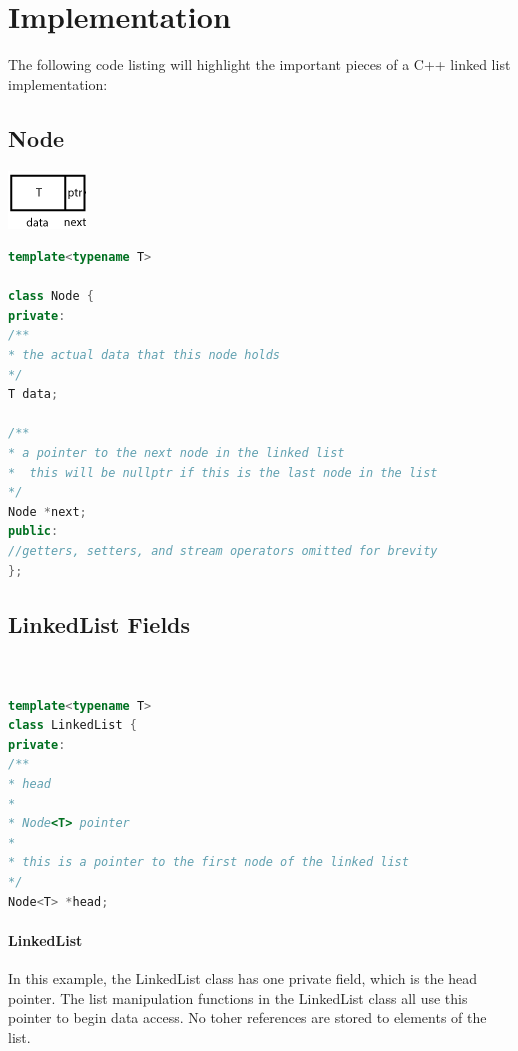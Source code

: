 \documentclass[12pt]{article}
\begin{document}
\newpage

\section{Implementation}

The following code listing will highlight the important pieces of a C++ linked list implementation:

\subsection{Node}

\includegraphics{node_diagram}

\begin{lstlisting}[language = C++]
template<typename T>

class Node {
private:
/**
* the actual data that this node holds
*/
T data;

/**
* a pointer to the next node in the linked list
*  this will be nullptr if this is the last node in the list
*/
Node *next;
public:
//getters, setters, and stream operators omitted for brevity
};
\end{lstlisting}

\newpage

\subsection{LinkedList Fields}

\begin{lstlisting}[language = C++]


template<typename T>
class LinkedList {
private:
/**
* head
*
* Node<T> pointer
*
* this is a pointer to the first node of the linked list
*/
Node<T> *head;
\end{lstlisting}

\paragraph{LinkedList}
In this example, the LinkedList class has one private field, which is the head pointer. The list manipulation functions in the LinkedList class all use this pointer to begin data access. No toher references are stored to elements of the list.

\newpage
\end{document}
